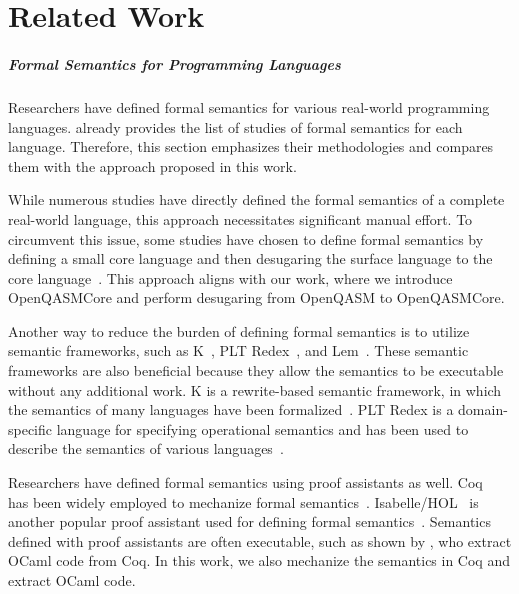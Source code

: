
\chapter{Related Work}
\label{ch:related}

\paragraph{Formal Semantics for Programming Languages}

Researchers have defined formal semantics for various real-world programming
languages.
%
 already provides the list of studies of formal
semantics for each language.
%
Therefore, this section emphasizes their methodologies and compares them with
the approach proposed in this work.

While numerous studies have directly defined the formal semantics of a complete
real-world language, this approach necessitates significant manual effort.
%
To circumvent this issue, some studies have chosen to define formal semantics
by defining a small core language and then desugaring the surface language to
the core
language~\cite{guha2010essence,politz2012tested,memarian2016depths,politz2013python}.
%
This approach aligns with our work, where we introduce OpenQASMCore and perform
desugaring from OpenQASM to OpenQASMCore.

Another way to reduce the burden of defining formal semantics is to utilize
semantic frameworks, such as K~\cite{rosu2010overview}, PLT
Redex~\cite{felleisen2009semantics}, and Lem~\cite{mulligan2014lem}.
%
These semantic frameworks are also beneficial because they allow the semantics
to be executable without any additional work.
%
K is a rewrite-based semantic framework, in which the semantics of many
languages have been
formalized~\cite{park2015kjs,ellison2012executable,bogdanas2015kjava,filaretti2014executable,jiao2020semantic}.
%
PLT Redex is a domain-specific language for specifying operational semantics
and has been used to describe the semantics of various
languages~\cite{guha2010essence,politz2013python}.

Researchers have defined formal semantics using proof assistants as well.
%
Coq~\cite{barras1997coq} has been widely employed to mechanize formal
semantics~\cite{bodin2014trusted,blazy2009mechanized,jung2017rustbelt,watt2021two}.
%
Isabelle/HOL~\cite{nipkow2002isabelle} is another popular proof assistant used
for defining formal semantics~\cite{klein2006machine,watt2018mechanising}.
%
Semantics defined with proof assistants are often executable, such as shown by
\citet{bodin2014trusted}, who extract OCaml code from Coq.
%
In this work, we also mechanize the semantics in Coq and extract OCaml code.

